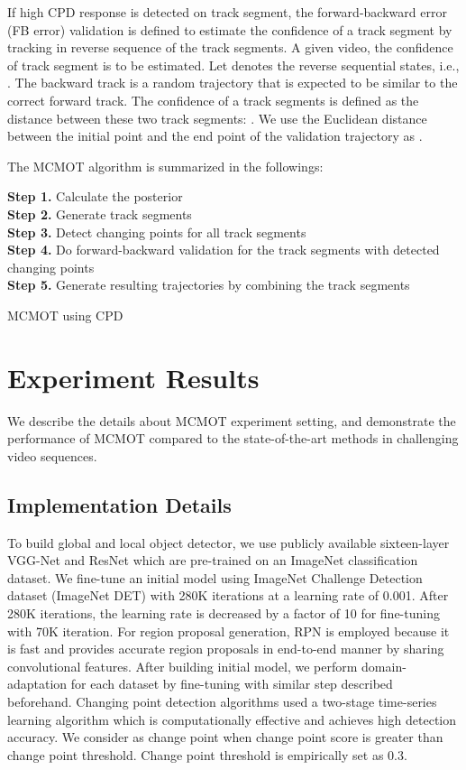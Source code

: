 \documentclass[runningheads]{llncs}
\begin{document}
If high CPD response is detected on track segment, the forward-backward error (FB error) validation \cite{Ref7} is defined to estimate the confidence of a track segment by tracking in reverse sequence of the track segments. A given video, the confidence of track segment \textit{}is to be estimated. Let \textit{} denotes the reverse sequential states, i.e., . The backward track is a random trajectory that is expected to be similar to the correct forward track. The confidence of a track segments is defined as the distance between these two track segments: . We use the Euclidean distance between the initial point and the end point of the validation trajectory as .

The MCMOT algorithm is summarized in the followings: 
\begin{algorithm}
  \textbf{Step 1.} Calculate the posterior  \\
  \textbf{Step 2.} Generate track segments \\
  \textbf{Step 3.} Detect changing points for all track segments \\ 
  \textbf{Step 4.} Do forward-backward validation for the track segments with detected changing points \\
  \textbf{Step 5.} Generate resulting trajectories by combining the track segments
  \caption{MCMOT using CPD}
\end{algorithm}

\section{Experiment Results}

We describe the details about MCMOT experiment setting, and demonstrate the performance of MCMOT compared to the state-of-the-art methods in challenging video sequences.

\subsection{Implementation Details}

To build global and local object detector, we use publicly available sixteen-layer VGG-Net \cite{Ref19} and ResNet \cite{Ref29} which are pre-trained on an ImageNet classification dataset. We fine-tune an initial model using ImageNet Challenge Detection dataset (ImageNet DET) with 280K iterations at a learning rate of 0.001. After 280K iterations, the learning rate is decreased by a factor of 10 for fine-tuning with 70K iteration. For region proposal generation, RPN \cite{Ref28} is employed because it is fast and provides accurate region proposals in end-to-end manner by sharing convolutional features. After building initial model, we perform domain-adaptation for each dataset by fine-tuning with similar step described beforehand. Changing point detection algorithms used a two-stage time-series learning algorithm \cite{Ref24} which is computationally effective and achieves high detection accuracy. We consider as change point when change point score is greater than change point threshold. Change point threshold is empirically set as 0.3. 
\end{document}
